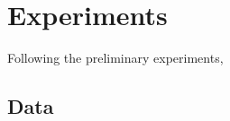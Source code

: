 
\chapter{Experiments}
\label{cap:experiments}

Following the preliminary experiments,

\section{Data}
\label{sec:data}
